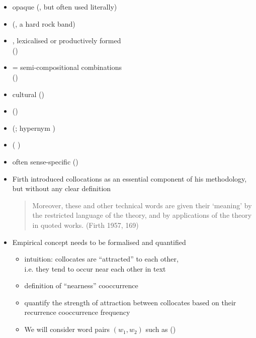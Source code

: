 \documentclass[a4paper,landscape,headrule,footrule,dvips]{foils}
\begin{document}
\begin{CJK}{UTF8}{min}
 
\begin{itemize}
\item opaque  
  (, but often used literally)
\item {} 
  (, a hard rock band)
\item {}, lexicalised or productively formed
\\()
\item {} = semi-compositional combinations
\\()
\item cultural  
  ()
\item {} ()
\item {} (; hypernym )
\item {} ( )
\item often sense-specific ()
\end{itemize}

\begin{itemize}
\item Firth introduced collocations as an essential component of
his methodology, but without any clear definition
\begin{quote}
  Moreover, these and other technical words are given their ‘meaning’
  by the restricted language of the theory, and by applications of the
  theory in quoted works. (Firth 1957, 169)
\end{quote}
\item Empirical concept needs to be formalised and quantified
  \begin{itemize}%
  \item intuition: collocates are “attracted” to each other, 
    \\ i.e. they tend to occur near each other in text
  \item definition of “nearness” \into cooccurrence
  \item quantify the strength of attraction between collocates based
    on their recurrence \into cooccurrence frequency
\item We will consider word pairs $(w_1, w_2)$ such as 
()


\end{itemize}
\end{itemize}
\end{CJK}
\end{document}

